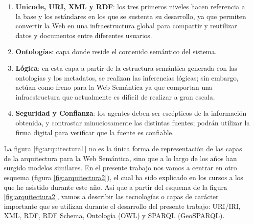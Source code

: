 \begin{enumerate}
	\item \textbf{Unicode, URI, XML y RDF}: los tres primeros niveles hacen referencia a la base y los estándares en los que se sustenta su desarrollo, ya que permiten convertir la Web en una infraestructura global para compartir y reutilizar datos y documentos entre diferentes usuarios.
	
	\item \textbf{Ontologías}: capa donde reside el contenido semántico del sistema. 
	
	\item \textbf{Lógica}: en esta capa a partir de la estructura semántica generada con las ontologías y los metadatos, se realizan las inferencias lógicas; sin embargo, actúan como freno para la Web Semántica ya que comportan una infraestructura que actualmente es difícil de realizar a gran escala. 
	
	\item \textbf{Seguridad y Confianza}: los agentes deben ser escépticos de la información obtenida, y contrastar minuciosamente las distintas fuentes; podrán utilizar la firma digital para verificar que la fuente es confiable. 
\end{enumerate}



La figura \ref{fig:arquitectura1} no es la única forma de representación de las capas de la arquitectura para la Web Semántica, sino que a lo largo de los años han surgido modelos similares. En el presente trabajo nos vamos a centrar en otro esquema (figura \ref{fig:arquitectura2}), el cual ha sido explicado en los cursos a los que he asistido durante este año. Así que a partir del esquema de la figura \ref{fig:arquitectura2}, vamos a describir las tecnologías o capas de carácter importante que se utilizan durante el desarrollo del presente trabajo: URI/IRI, XML, RDF, RDF Schema, Ontología (OWL) y SPARQL (GeoSPARQL).



